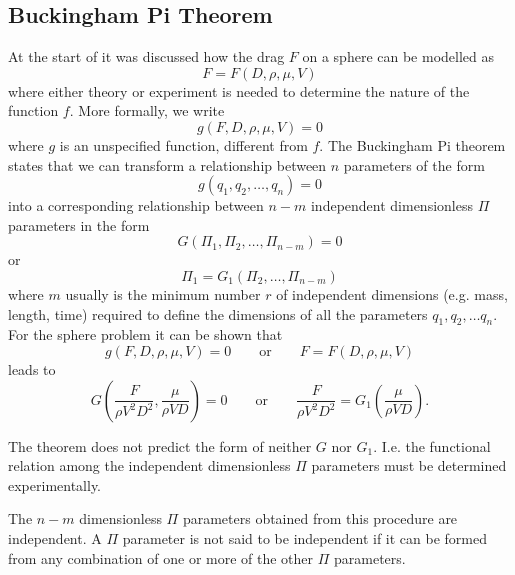 \subsection{Buckingham Pi Theorem}
At the start of  it was discussed how the drag $F$ on a sphere can be modelled as
\[ 
F = F(D, \rho, \mu, V)
\]
where either theory or experiment is needed to determine the nature of the function $f$. More formally, we write
\[ 
g(F, D, \rho, \mu,V) = 0
\]
where $g$ is an unspecified function, different from $f$. The Buckingham Pi theorem states that we can transform a relationship between $n$ parameters of the form
\[ 
g(q_1,q_2,\ldots ,q_n) = 0
\]
into a corresponding relationship between $n-m$ independent dimensionless $\Pi$ parameters in the form
\[ 
G \left( \Pi_1,\Pi_2,\ldots,\Pi_{n-m} \right) = 0
\]
or
\[ 
\Pi_1 = G_1 \left( \Pi_2,\ldots ,\Pi_{n-m} \right)
\]
where $m$ usually is the minimum number $r$ of independent dimensions (e.g. mass, length, time) required to define the dimensions of all the parameters $q_1, q_2,\ldots q_n$. For the sphere problem it can be shown that
\[ 
g(F,D,\rho,\mu,V) = 0 \qquad \text{or}\qquad F=F(D,\rho,\mu,V)
\]
leads to
\[ 
G \left( \frac{F}{\rho V^2 D^2}, \frac{\mu}{\rho V D} \right) = 0 \qquad \text{or} \qquad \frac{F}{\rho V^2 D ^2} = G_1 \left( \frac{\mu}{\rho VD} \right)
.\]

The theorem does not predict the form of neither $G$ nor $G_1$. I.e. the functional relation among the independent dimensionless $\Pi$ parameters must be determined experimentally.

The $n-m$ dimensionless $\Pi$ parameters obtained from this procedure are independent. A $\Pi$ parameter is not said to be independent if it can be formed from any combination of one or more of the other $\Pi$ parameters.

